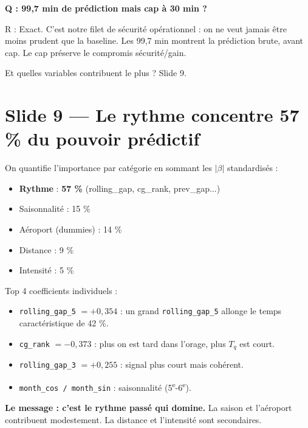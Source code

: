 \documentclass[11pt,a4paper]{article}
\begin{document}
\begin{piege}
\textbf{Q : 99,7 min de prédiction mais cap à 30 min ?}

R : Exact. C'est notre filet de sécurité opérationnel : on ne veut jamais être moins
prudent que la baseline. Les 99,7 min montrent la prédiction brute, avant cap. Le cap
préserve le compromis sécurité/gain.
\end{piege}

\begin{transit}
\og Et quelles variables contribuent le plus ? Slide 9. \fg{}
\end{transit}

\section{Slide 9 — Le rythme concentre 57 \% du pouvoir prédictif}

\begin{dire}
\og On quantifie l'importance par catégorie en sommant les $|\beta|$ standardisés :
\begin{itemize}
    \item \textbf{Rythme} : \textbf{57 \%} (rolling\_gap, cg\_rank, prev\_gap...)
    \item Saisonnalité : 15 \%
    \item Aéroport (dummies) : 14 \%
    \item Distance : 9 \%
    \item Intensité : 5 \%
\end{itemize}

Top 4 coefficients individuels :
\begin{itemize}
    \item \texttt{rolling\_gap\_5} $= +0{,}354$ : un grand \texttt{rolling\_gap\_5} allonge
    le temps caractéristique de 42 \%.
    \item \texttt{cg\_rank} $= -0{,}373$ : plus on est tard dans l'orage, plus $T_q$ est court.
    \item \texttt{rolling\_gap\_3} $= +0{,}255$ : signal plus court mais cohérent.
    \item \texttt{month\_cos / month\_sin} : saisonnalité (5\textsuperscript{e}-6\textsuperscript{e}).
\end{itemize}

\textbf{Le message : c'est le rythme passé qui domine.} La saison et l'aéroport contribuent
modestement. La distance et l'intensité sont secondaires. \fg{}
\end{dire}
\end{document}
